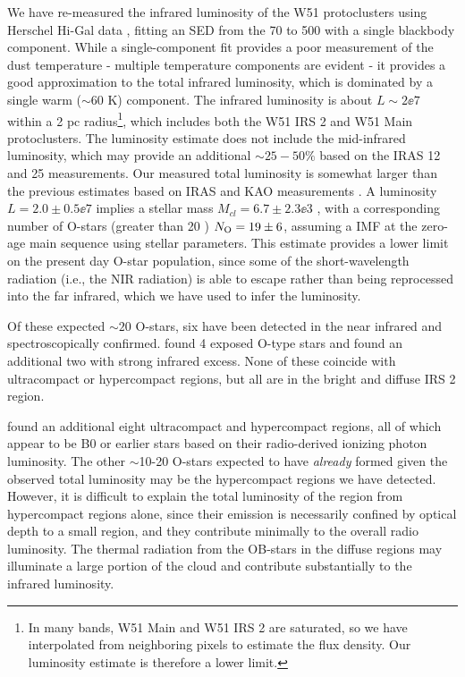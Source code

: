 We have re-measured the infrared luminosity of the W51 protoclusters using Herschel
Hi-Gal data \citep{Molinari2010a,Traficante2011a}, fitting an SED from the 70
to 500 \um with a single blackbody component.
While a single-component fit provides a poor
measurement of the dust temperature - multiple temperature components are
evident \citep{Sievers1991a} - it provides a good approximation to the total
infrared luminosity, which is dominated by a single warm ($\sim60$ K)
component.  The infrared luminosity is about $L\sim2\ee{7}$ \lsun within a 2 pc
radius\footnote{In many bands, W51 Main and W51 IRS 2 are
saturated, so we have interpolated from neighboring pixels to estimate the flux
density.
Our luminosity estimate is therefore a lower limit.}, which includes
both the W51 IRS 2 and W51 Main protoclusters.  The luminosity estimate does not
include the mid-infrared luminosity, which may provide an additional
$\sim25-50\%$ based on
the IRAS 12 and 25 \um measurements.  Our measured total luminosity is somewhat
larger than the previous estimates based on IRAS and KAO measurements
\citep{Harvey1986a,Sievers1991a}.
A luminosity $L=2.0\pm0.5\ee{7}$ \lsun implies
a stellar mass $M_{cl} = 6.7 \pm 2.3\ee{3}$ \msun, with a corresponding number of
O-stars (greater than 20 \msun) $N_{\rm O} = 19 \pm 6$, assuming a
\citet{Kroupa2001a} IMF at the zero-age main sequence using \citet{Vacca1996a}
stellar parameters.  This estimate provides a lower limit on the present day
O-star population, since some of the short-wavelength radiation (i.e., the NIR
radiation) is able to escape rather than being reprocessed into the far
infrared, which we have used to infer the luminosity.

Of these expected $\sim20$ O-stars, six have been detected in the near infrared
and spectroscopically confirmed.  \citet{Figueredo2008a} found 4 exposed O-type
stars and \citet{Barbosa2008a} found an additional two with strong infrared
excess.  None of these coincide with ultracompact or hypercompact \hii regions,
but all are in the bright and diffuse IRS 2 \hii region.

\citet{Mehringer1994a} found an additional eight ultracompact and hypercompact
\hii regions, all of which appear to be B0 or earlier stars based on their
radio-derived ionizing photon luminosity.  The other $\sim$10-20 O-stars
expected to have \emph{already} formed given the observed total luminosity may
be the hypercompact \hii regions we have detected.  However, it is difficult to
explain the total luminosity of the region from hypercompact \hii regions
alone, since their emission is necessarily confined by optical depth to a small
region, and they contribute minimally to the overall radio luminosity.  The
thermal radiation from the OB-stars in the diffuse \hii regions may illuminate
a large portion of the cloud and contribute substantially to the infrared
luminosity.

